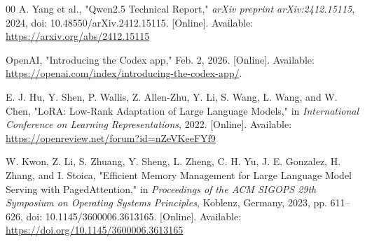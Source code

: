 \documentclass[conference]{IEEEtran}
\begin{document}
\begin{thebibliography}{00}
A. Yang et al.,
"Qwen2.5 Technical Report,"
\emph{arXiv preprint arXiv:2412.15115}, 2024, doi: 10.48550/arXiv.2412.15115. [Online]. Available: \url{https://arxiv.org/abs/2412.15115}

OpenAI,
"Introducing the Codex app," Feb. 2, 2026. [Online]. Available:
\url{https://openai.com/index/introducing-the-codex-app/}.

E. J. Hu, Y. Shen, P. Wallis, Z. Allen-Zhu, Y. Li, S. Wang, L. Wang, and W. Chen,
"LoRA: Low-Rank Adaptation of Large Language Models,"
in \emph{International Conference on Learning Representations}, 2022. [Online]. Available: \url{https://openreview.net/forum?id=nZeVKeeFYf9}

W. Kwon, Z. Li, S. Zhuang, Y. Sheng, L. Zheng, C. H. Yu, J. E. Gonzalez, H. Zhang, and I. Stoica,
"Efficient Memory Management for Large Language Model Serving with PagedAttention,"
in \emph{Proceedings of the ACM SIGOPS 29th Symposium on Operating Systems Principles}, Koblenz, Germany, 2023, pp. 611--626, doi: 10.1145/3600006.3613165. [Online]. Available: \url{https://doi.org/10.1145/3600006.3613165}

\end{thebibliography}
\end{document}
